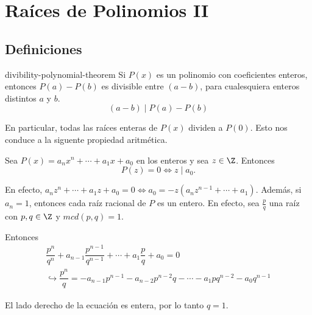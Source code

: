 \newpage
\section{Raíces de Polinomios II}


\subsection{Definiciones}

\begin{section-theorem.tcb}{}{divibility-polynomial-theorem}
    Si $P(x)$ es un polinomio con coeficientes enteros, entonces $P(a) - P(b)$ es divisible entre $(a - b)$, para cualesquiera enteros distintos $a$ y $b$.
    \[(a - b) \mid P(a) - P(b)\]
\end{section-theorem.tcb}

En particular, todas las raíces enteras de $P(x)$ dividen a $P(0)$.
Esto nos conduce a la siguente propiedad aritmética.

\begin{section-definition.tcb}
    Sea $P(x) = a_n x^n + \cdots + a_1 x + a_0$ en los enteros y sea $z \in \Z$.
    Entonces \[P(z) = 0 \Leftrightarrow z \mid a_0.\]
\end{section-definition.tcb}

En efecto, $a_n z^n + \cdots + a_1 z + a_0 = 0 \Leftrightarrow a_0 = -z(a_n z^{n - 1} + \cdots + a_1)$.
Además, si $a_n = 1$, entonces cada raíz racional de $P$ es un entero.
En efecto, sea $\frac{p}{q}$ una raíz con $p, q \in \Z$ y $mcd(p, q) = 1$.

Entonces
\begin{gather*}
    \dfrac{p^n}{q^n} + a_{n - 1} \dfrac{p^{n - 1}}{q^{n - 1}} + \cdots + a_1 \dfrac{p}{q} + a_0  = 0 \\
    \hookrightarrow \dfrac{p^n}{q} = - a_{n - 1} p^{n - 1} - a_{n - 2} p^{n - 2} q - \cdots - a_1 p q^{n - 2} - a_0 q^{n - 1}
\end{gather*}

El lado derecho de la ecuación es entera, por lo tanto $q = 1$.

